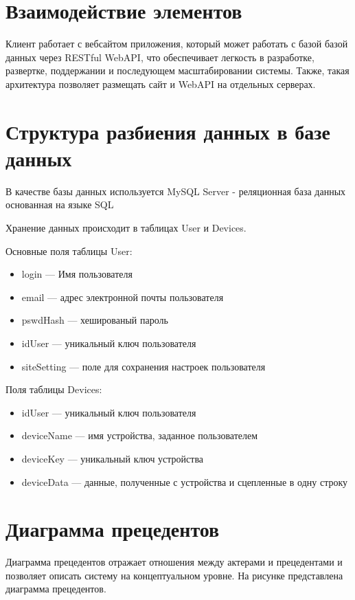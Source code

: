 
\section{Взаимодействие элементов}
Клиент работает с вебсайтом приложения, который может работать с базой базой данных
через RESTful WebAPI, что обеспечивает легкость в разработке, развертке, поддержании и
последующем масштабировании системы. Также, такая архитектура позволяет размещать сайт
и WebAPI на отдельных серверах.

\section{Структура разбиения данных в базе данных}
В качестве базы данных используется MySQL Server - реляционная база данных основанная на 
языке SQL\par
Хранение данных происходит в таблицах User и Devices.\par
Основные поля таблицы User:
\begin{itemize}
    \item login --- Имя пользователя
    \item email --- адрес электронной почты пользователя
    \item pswdHash --- хешированый пароль
    \item idUser --- уникальный ключ пользователя
    \item siteSetting --- поле для сохранения настроек пользователя
\end{itemize}
Поля таблицы Devices:
\begin{itemize}
    \item idUser --- уникальный ключ пользователя
    \item deviceName --- имя устройства, заданное пользователем
    \item deviceKey --- уникальный ключ устройства
    \item deviceData --- данные, полученные с устройства и сцепленные в одну строку
\end{itemize}

\section{Диаграмма прецедентов}
Диаграмма прецедентов отражает отношения между актерами и прецедентами и позволяет 
описать систему на концептуальном уровне. На рисунке представлена диаграмма прецедентов.

